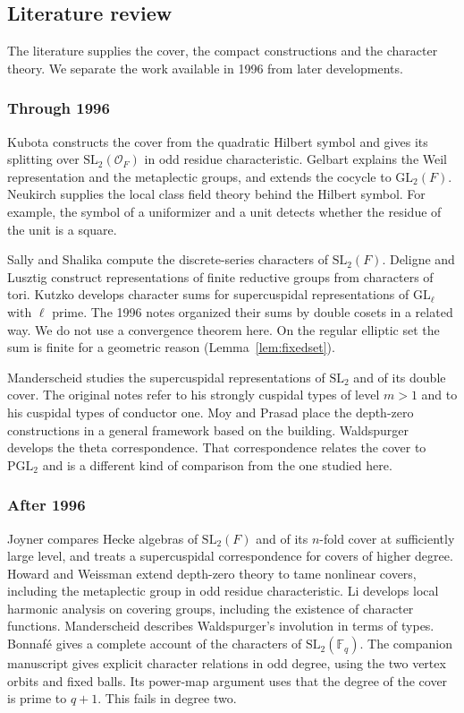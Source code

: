\documentclass[12pt,letterpaper]{article}
\numberwithin{equation}{section}
\theoremstyle{definition}
\theoremstyle{remark}
\newcommand{\OO}{\mathcal O_F}
\newcommand{\kk}{\mathbb F_q}
\begin{document}
\subsection{Literature review}
The literature supplies the cover, the compact constructions and the character theory. We separate the work available in 1996 from later developments.

\subsubsection*{Through 1996}
Kubota \cite{Ku67} constructs the cover from the quadratic Hilbert symbol and gives its splitting over $\mathrm{SL}_2(\OO)$ in odd residue characteristic. Gelbart \cite{Ge76} explains the Weil representation and the metaplectic groups, and extends the cocycle to $\mathrm{GL}_2(F)$. Neukirch \cite{Ne86} supplies the local class field theory behind the Hilbert symbol. For example, the symbol of a uniformizer and a unit detects whether the residue of the unit is a square.

Sally and Shalika \cite{SS68} compute the discrete-series characters of $\mathrm{SL}_2(F)$. Deligne and Lusztig \cite{DL76} construct representations of finite reductive groups from characters of tori. Kutzko \cite{Ku87} develops character sums for supercuspidal representations of $\mathrm{GL}_{\ell}$ with $\ell$ prime. The 1996 notes organized their sums by double cosets in a related way. We do not use a convergence theorem here. On the regular elliptic set the sum is finite for a geometric reason (Lemma~\ref{lem:fixedset}).

Manderscheid \cite{Ma84a,Ma84b} studies the supercuspidal representations of $\mathrm{SL}_2$ and of its double cover. The original notes refer to his strongly cuspidal types of level $m>1$ and to his cuspidal types of conductor one. Moy and Prasad \cite{MP94} place the depth-zero constructions in a general framework based on the building. Waldspurger \cite{Wa91} develops the theta correspondence. That correspondence relates the cover to $\mathrm{PGL}_2$ and is a different kind of comparison from the one studied here.

\subsubsection*{After 1996}
Joyner \cite{Jo98} compares Hecke algebras of $\mathrm{SL}_2(F)$ and of its $n$-fold cover at sufficiently large level, and \cite{Jo99} treats a supercuspidal correspondence for covers of higher degree. Howard and Weissman \cite{HW09} extend depth-zero theory to tame nonlinear covers, including the metaplectic group in odd residue characteristic. Li \cite{Li12} develops local harmonic analysis on covering groups, including the existence of character functions. Manderscheid \cite{Ma04} describes Waldspurger's involution in terms of types. Bonnaf\'e \cite{Bo11} gives a complete account of the characters of $\mathrm{SL}_2(\kk)$. The companion manuscript \cite{Jo26} gives explicit character relations in odd degree, using the two vertex orbits and fixed balls. Its power-map argument uses that the degree of the cover is prime to $q+1$. This fails in degree two.
\end{document}

